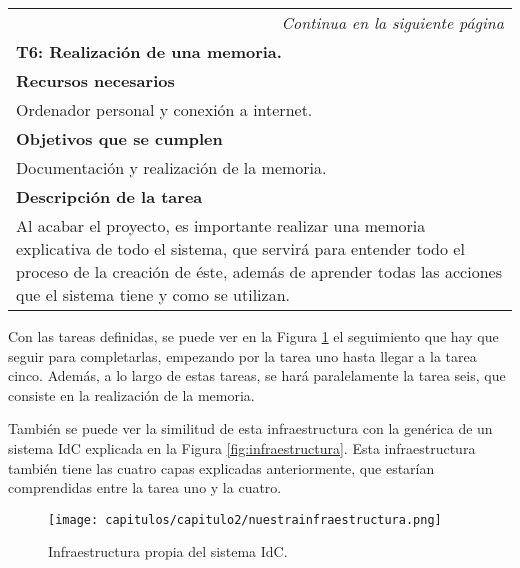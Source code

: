 \begin{longtable}{|p{}|}
\hline
\endfirsthead
\endhead
\hline \multicolumn{1}{r}{\textit{Continua en la siguiente página}} \\
\endfoot
\endlastfoot
    \rowcolor[gray]{.5}
    {\color{white}\textbf{T6: Realización de una memoria.}} \\
    \hline
    \rowcolor[gray]{.9}
    \textbf{Recursos necesarios} \\
    \hline
    Ordenador personal y conexión a internet. \\
    \hline
    \rowcolor[gray]{.9}
    \textbf{Objetivos que se cumplen} \\
    \hline
    Documentación y realización de la memoria.\\
    \hline
    \rowcolor[gray]{.9}
    \textbf{Descripción de la tarea} \\
    \hline
    Al acabar el proyecto, es importante realizar una memoria explicativa de todo el sistema, que servirá para entender todo el proceso de la creación de éste, además de aprender todas las acciones que el sistema tiene y como se utilizan.\\
    \hline
\end{longtable}

Con las tareas definidas, se puede ver en la Figura \ref{fig:nuestrainfraestructura} el seguimiento que hay que seguir para completarlas, empezando por la tarea uno hasta llegar a la tarea cinco. Además, a lo largo de estas tareas, se hará paralelamente la tarea seis, que consiste en la realización de la memoria.

También se puede ver la similitud de esta infraestructura con la genérica de un sistema IdC explicada en la Figura \ref{fig:infraestructura}. Esta infraestructura también tiene las cuatro capas explicadas anteriormente, que estarían comprendidas entre la tarea uno y la cuatro.

\makeatletter
\setlength{\@fptop}{0pt}
\makeatother

\begin{figure}[t!]
    \centering
    \texttt{[image: capitulos/capitulo2/nuestrainfraestructura.png]}
    \caption{Infraestructura propia del sistema IdC.}
    \label{fig:nuestrainfraestructura}
\end{figure}